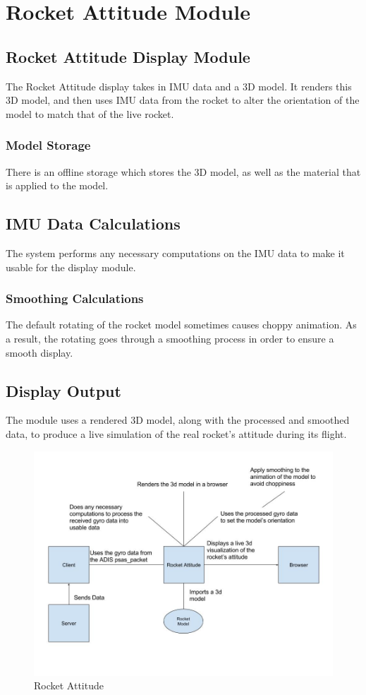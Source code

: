 \section{Rocket Attitude Module}

\subsection{Rocket Attitude Display Module}
The Rocket Attitude display takes in IMU data and a 3D model. It renders this 3D model, and then uses IMU data from the rocket to alter the orientation of the model to match that of the live rocket.

\subsubsection{Model Storage}
There is an offline storage which stores the 3D model, as well as the material that is applied to the model.

\subsection{IMU Data Calculations}
The system performs any necessary computations on the IMU data to make it usable for the display module.

\subsubsection{Smoothing Calculations}
The default rotating of the rocket model sometimes causes choppy animation. As a result, the rotating goes through a smoothing process in order to ensure a smooth display.

\subsection{Display Output}
The module uses a rendered 3D model, along with the processed and smoothed data, to produce a live simulation of the real rocket's attitude during its flight.

\begin{figure}[ht!]
\centering
\includegraphics[scale=.4]{imgs/attitude.jpg}
\caption{Rocket Attitude \label{overflow}}
\end{figure}
